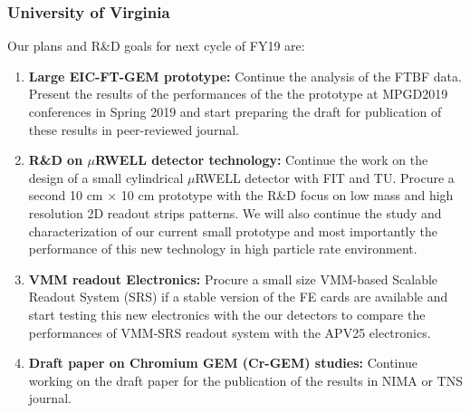 \subsubsection{University of Virginia} 
Our plans and R\&D goals for next cycle of FY19 are:
%
\begin{enumerate}[leftmargin=*]
%
\item \textbf{Large EIC-FT-GEM prototype:} Continue the analysis of the FTBF data. Present the results of the performances of the the prototype at MPGD2019 conferences in Spring 2019 and start preparing the draft for publication of these results in peer-reviewed journal.
%
\item \textbf{R\&D on $\mu$RWELL detector technology:} Continue the work on the design of a small cylindrical  $\mu$RWELL detector with FIT and TU. Procure a second 10 cm $\times$ 10 cm prototype with the R\&D focus on low mass and high resolution 2D readout strips patterns. We will also continue the study and characterization of our current small prototype and most importantly the performance of this new technology in high particle rate environment. 
%
\item \textbf{VMM readout Electronics:} Procure a small size VMM-based Scalable Readout System (SRS) if  a stable version of the FE cards are available and start testing this new  electronics with the our detectors to compare the performances of VMM-SRS readout system with the APV25 electronics.
%
\item \textbf{Draft paper on Chromium GEM (Cr-GEM) studies:}  Continue working on the draft  paper for the publication of the results in NIMA or TNS journal.
\end{enumerate}